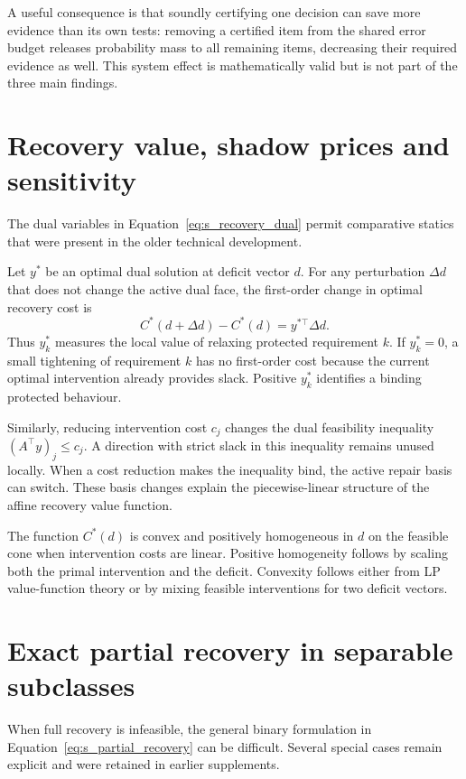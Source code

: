 \documentclass[11pt,letterpaper]{article}
\theoremstyle{plain}
\newcommand{\1}{\mathbf 1}
\begin{document}
A useful consequence is that soundly certifying one decision can save more evidence than its own tests: removing a certified item from the shared error budget releases probability mass to all remaining items, decreasing their required evidence as well. This system effect is mathematically valid but is not part of the three main findings.

\section{Recovery value, shadow prices and sensitivity}
The dual variables in Equation~\ref{eq:s_recovery_dual} permit comparative statics that were present in the older technical development.

Let $y^*$ be an optimal dual solution at deficit vector $d$. For any perturbation $\Delta d$ that does not change the active dual face, the first-order change in optimal recovery cost is
\begin{equation}
 C^*(d+\Delta d)-C^*(d)=y^{*\top}\Delta d.
\label{eq:s_shadow_sensitivity}
\end{equation}
Thus $y_k^*$ measures the local value of relaxing protected requirement $k$. If $y_k^*=0$, a small tightening of requirement $k$ has no first-order cost because the current optimal intervention already provides slack. Positive $y_k^*$ identifies a binding protected behaviour.

Similarly, reducing intervention cost $c_j$ changes the dual feasibility inequality $(A^\top y)_j\le c_j$. A direction with strict slack in this inequality remains unused locally. When a cost reduction makes the inequality bind, the active repair basis can switch. These basis changes explain the piecewise-linear structure of the affine recovery value function.

The function $C^*(d)$ is convex and positively homogeneous in $d$ on the feasible cone when intervention costs are linear. Positive homogeneity follows by scaling both the primal intervention and the deficit. Convexity follows either from LP value-function theory or by mixing feasible interventions for two deficit vectors.

\section{Exact partial recovery in separable subclasses}
When full recovery is infeasible, the general binary formulation in Equation~\ref{eq:s_partial_recovery} can be difficult. Several special cases remain explicit and were retained in earlier supplements.
\end{document}
